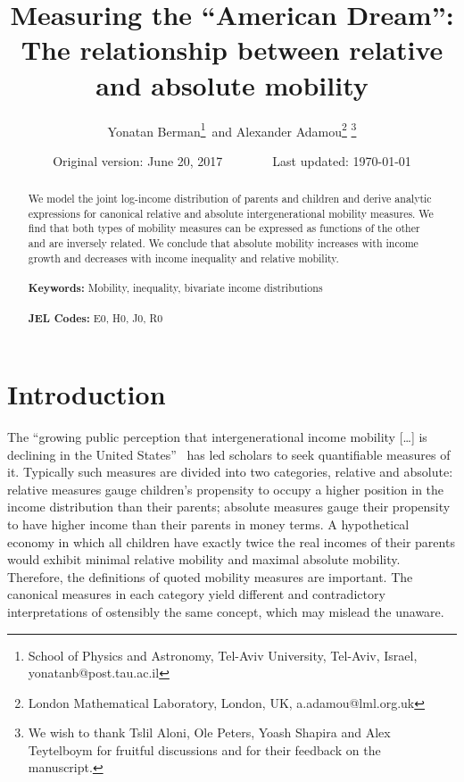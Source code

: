 \documentclass[12pt,times,letter]{article}
\numberwithin{equation}{section}
\begin{document}
\doublespacing

\begin{titlepage}
\title{Measuring the ``American Dream'': The relationship between relative and absolute mobility}
\author{Yonatan Berman\footnote{School of Physics and Astronomy, Tel-Aviv University, Tel-Aviv, Israel, yonatanb@post.tau.ac.il}\, and Alexander Adamou\footnote{London Mathematical Laboratory, London, UK, a.adamou@lml.org.uk} \thanks{We wish to thank Tslil Aloni, Ole Peters, Yoash Shapira and Alex Teytelboym for fruitful discussions and for their feedback on the manuscript.}}
\date{Original version: June 20, 2017\,\,\,\,\,\,\,\,\,\,\,\,\,\,\,\,\,\,\,\,\,\,\,\,Last updated: \today}
\maketitle
\begin{abstract}
\noindent We model the joint log-income distribution of parents and children and derive analytic expressions for canonical relative and absolute intergenerational mobility measures. We find that both types of mobility measures can be expressed as functions of the other and are inversely related. We conclude that absolute mobility increases with income growth and decreases with income inequality and relative mobility.\\
\vspace{0in}\\
\noindent\textbf{Keywords:} Mobility, inequality, bivariate income distributions\\
\vspace{0in}\\
\noindent\textbf{JEL Codes:} E0, H0, J0, R0\\

\bigskip
\end{abstract}
\setcounter{page}{0}
\thispagestyle{empty}
\end{titlepage}
\pagebreak \newpage

\doublespacing

\section{Introduction} \label{sec:introduction}

The ``growing public perception that intergenerational income mobility [\ldots] is declining in the United States''~\citep[p.~141]{chetty2014united} has led scholars to seek quantifiable measures of it. Typically such measures are divided into two categories, relative and absolute: relative measures gauge children's propensity to occupy a higher position in the income distribution than their parents; absolute measures gauge their propensity to have higher income than their parents in money terms. A hypothetical economy in which all children have exactly twice the real incomes of their parents would exhibit minimal relative mobility and maximal absolute mobility. Therefore, the definitions of quoted mobility measures are important. The canonical measures in each category yield different and contradictory interpretations of ostensibly the same concept, which may mislead the unaware.
\end{document}

